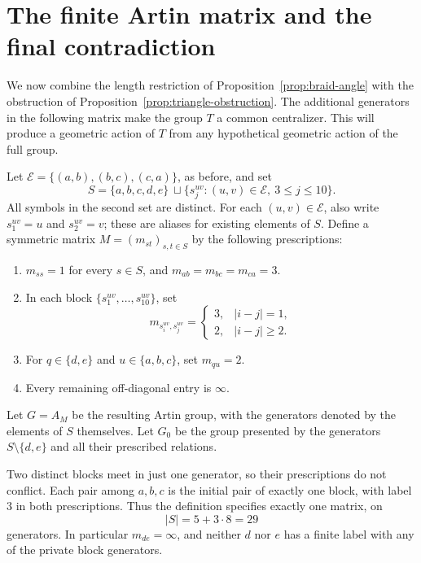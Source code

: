 \section{The finite Artin matrix and the final contradiction}
\label{sec:assembly}

We now combine the length restriction of Proposition~\ref{prop:braid-angle}
with the obstruction of Proposition~\ref{prop:triangle-obstruction}.
The additional generators in the following matrix make the group $T$ a
common centralizer.  This will produce a geometric action of $T$ from
any hypothetical geometric action of the full group.

\begin{definition}\label{def:matrix}
Let $\mathcal E=\{(a,b),(b,c),(c,a)\}$, as before, and set
\[
 S=\{a,b,c,d,e\}\ \sqcup
   \{s_j^{uv}:(u,v)\in\mathcal E,\ 3\le j\le10\}.
\]
All symbols in the second set are distinct.  For each $(u,v)\in\mathcal E$,
also write $s_1^{uv}=u$ and $s_2^{uv}=v$; these are aliases for existing
elements of $S$.  Define a symmetric matrix $M=(m_{st})_{s,t\in S}$ by
the following prescriptions:
\begin{enumerate}
\item $m_{ss}=1$ for every $s\in S$, and
      $m_{ab}=m_{bc}=m_{ca}=3$.
\item In each block $\{s_1^{uv},\ldots,s_{10}^{uv}\}$, set
      \[
      m_{s_i^{uv},s_j^{uv}}=
      \begin{cases}
      3,&|i-j|=1,\\
      2,&|i-j|\ge2.
      \end{cases}
      \]
\item For $q\in\{d,e\}$ and $u\in\{a,b,c\}$, set $m_{qu}=2$.
\item Every remaining off-diagonal entry is $\infty$.
\end{enumerate}
Let $G=A_M$ be the resulting Artin group, with the generators denoted
by the elements of $S$ themselves.  Let $G_0$ be the group presented
by the generators $S\setminus\{d,e\}$ and all their prescribed relations.
\end{definition}

Two distinct blocks meet in just one generator, so their prescriptions
do not conflict.  Each pair among $a,b,c$ is the initial pair of exactly
one block, with label $3$ in both prescriptions.  Thus the definition
specifies exactly one matrix, on
\[
 |S|=5+3\cdot8=29
\]
generators.  In particular $m_{de}=\infty$, and neither $d$ nor $e$
has a finite label with any of the private block generators.

